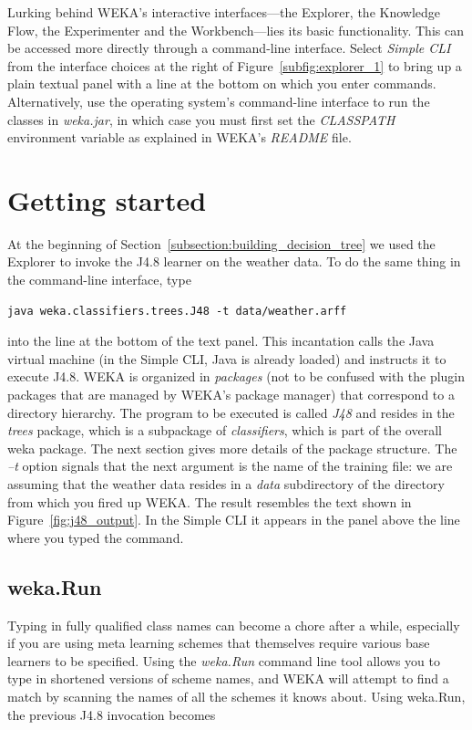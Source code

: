 Lurking behind WEKA's interactive interfaces---the Explorer, the
Knowledge Flow, the Experimenter and the Workbench---lies its basic
functionality. This can be accessed more directly through a
command-line interface. Select \textit{Simple CLI} from the interface
choices at the right of Figure~\ref{subfig:explorer_1} to bring up a
plain textual panel with a line at the bottom on which you enter
commands. Alternatively, use the operating system's command-line
interface to run the classes in \textit{weka.jar}, in which case you
must first set the \textit{CLASSPATH} environment variable as
explained in WEKA's \textit{README} file.

\section{Getting started}

At the beginning of Section~\ref{subsection:building_decision_tree} we
used the Explorer to invoke the J4.8 learner on the weather data. To
do the same thing in the command-line interface, type

\begin{Verbatim}[fontsize=\footnotesize]
java weka.classifiers.trees.J48 -t data/weather.arff
\end{Verbatim}

\noindent into the line at the bottom of the text panel. This
incantation calls the Java virtual machine (in the Simple CLI, Java is
already loaded) and instructs it to execute J4.8. WEKA is organized in
\textit{packages} (not to be confused with the plugin packages that
are managed by WEKA's package manager) that correspond to a directory
hierarchy. The program to be executed is called \textit{J48} and
resides in the \textit{trees} package, which is a subpackage of
\textit{classifiers}, which is part of the overall weka package. The
next section gives more details of the package structure. The
\textit{--t} option signals that the next argument is the name of the
training file: we are assuming that the weather data resides in a
\textit{data} subdirectory of the directory from which you fired up
WEKA. The result resembles the text shown in
Figure~\ref{fig:j48_output}. In the Simple CLI it appears in the panel
above the line where you typed the command.

\subsection{weka.Run}

Typing in fully qualified class names can become a chore after a
while, especially if you are using meta learning schemes that
themselves require various base learners to be specified. Using the
\textit{weka.Run} command line tool allows you to type in shortened versions of
scheme names, and WEKA will attempt to find a match by scanning the
names of all the schemes it knows about. Using weka.Run, the previous
J4.8 invocation becomes

